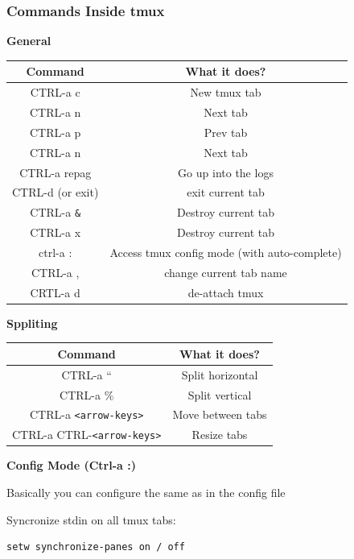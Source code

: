 \documentclass{article}
\newenvironment{codetemplate}[1][]{%
  \mybasecolorbox[#1]
  \itshape
}{%
  \endmybasecolorbox
}
\begin{document}
\subsubsection{Commands Inside tmux}
\textbf{General}
\begin{table}[H]
\begin{tabular}{| c  |c  |}
\hline
\textbf{Command} & \textbf{What it does?} \\ \hline
CTRL-a c & New tmux tab \\
CTRL-a n & Next tab \\
CTRL-a p & Prev tab \\
CTRL-a n & Next tab \\
CTRL-a repag & Go up into the logs \\
CTRL-d (or exit) & exit current tab \\
CTRL-a \verb|&| & Destroy current tab \\
CTRL-a x & Destroy current tab \\
ctrl-a : & Access tmux config mode (with auto-complete) \\
CTRL-a , & change current tab name \\
CRTL-a d & de-attach tmux \\
\hline
\end{tabular}
\end{table}

\textbf{Sppliting}
\begin{table}[H]
\begin{tabular}{| c  |c  |}
\hline
\textbf{Command} & \textbf{What it does?} \\ \hline
CTRL-a “ & Split horizontal \\
CTRL-a \% & Split vertical \\
CTRL-a \verb|<arrow-keys>| & Move between tabs \\
CTRL-a CTRL-\verb|<arrow-keys>| & Resize tabs \\
\hline
\end{tabular}
\end{table}

\textbf{Config Mode (Ctrl-a :)}

Basically you can configure the same as in the config file

Syncronize stdin on all tmux tabs:
\begin{codetemplate}
\begin{verbatim}
setw synchronize-panes on / off
\end{verbatim}
\end{codetemplate}
\end{document}
